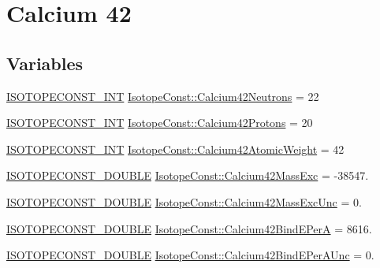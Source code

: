 \hypertarget{group___isotope_const-_calcium-_ca42}{}\section{Calcium 42}
\label{group___isotope_const-_calcium-_ca42}
\subsection*{Variables}
\begin{DoxyCompactItemize}
\item 
\mbox{\hyperlink{group___isotope_const-_macros_ga5f18360b3e99483a35c32d789e62621c}{I\+S\+O\+T\+O\+P\+E\+C\+O\+N\+S\+T\+\_\+\+I\+NT}} \mbox{\hyperlink{group___isotope_const-_calcium-_ca42_ga208fbe1d3806f305ab544478224f7ac1}{Isotope\+Const\+::\+Calcium42\+Neutrons}} = 22
\item 
\mbox{\hyperlink{group___isotope_const-_macros_ga5f18360b3e99483a35c32d789e62621c}{I\+S\+O\+T\+O\+P\+E\+C\+O\+N\+S\+T\+\_\+\+I\+NT}} \mbox{\hyperlink{group___isotope_const-_calcium-_ca42_ga2791770353cb5c072a663d48b5778b6b}{Isotope\+Const\+::\+Calcium42\+Protons}} = 20
\item 
\mbox{\hyperlink{group___isotope_const-_macros_ga5f18360b3e99483a35c32d789e62621c}{I\+S\+O\+T\+O\+P\+E\+C\+O\+N\+S\+T\+\_\+\+I\+NT}} \mbox{\hyperlink{group___isotope_const-_calcium-_ca42_ga43336a15e91ec28839a6faa980665d9d}{Isotope\+Const\+::\+Calcium42\+Atomic\+Weight}} = 42
\item 
\mbox{\hyperlink{group___isotope_const-_macros_ga8f45a7272ce02c0b4c65c44636ed719a}{I\+S\+O\+T\+O\+P\+E\+C\+O\+N\+S\+T\+\_\+\+D\+O\+U\+B\+LE}} \mbox{\hyperlink{group___isotope_const-_calcium-_ca42_ga15e978c03942844bdb8bec8f425c116f}{Isotope\+Const\+::\+Calcium42\+Mass\+Exc}} = -\/38547.
\item 
\mbox{\hyperlink{group___isotope_const-_macros_ga8f45a7272ce02c0b4c65c44636ed719a}{I\+S\+O\+T\+O\+P\+E\+C\+O\+N\+S\+T\+\_\+\+D\+O\+U\+B\+LE}} \mbox{\hyperlink{group___isotope_const-_calcium-_ca42_ga231c3a2558032e1eef67d8486ebeaaa7}{Isotope\+Const\+::\+Calcium42\+Mass\+Exc\+Unc}} = 0.
\item 
\mbox{\hyperlink{group___isotope_const-_macros_ga8f45a7272ce02c0b4c65c44636ed719a}{I\+S\+O\+T\+O\+P\+E\+C\+O\+N\+S\+T\+\_\+\+D\+O\+U\+B\+LE}} \mbox{\hyperlink{group___isotope_const-_calcium-_ca42_ga639b5e422df54583ac09b3d5d4074cca}{Isotope\+Const\+::\+Calcium42\+Bind\+E\+PerA}} = 8616.
\item 
\mbox{\hyperlink{group___isotope_const-_macros_ga8f45a7272ce02c0b4c65c44636ed719a}{I\+S\+O\+T\+O\+P\+E\+C\+O\+N\+S\+T\+\_\+\+D\+O\+U\+B\+LE}} \mbox{\hyperlink{group___isotope_const-_calcium-_ca42_gab502eaafffa78586f2196507aaab1d48}{Isotope\+Const\+::\+Calcium42\+Bind\+E\+Per\+A\+Unc}} = 0.

\end{DoxyCompactItemize}
